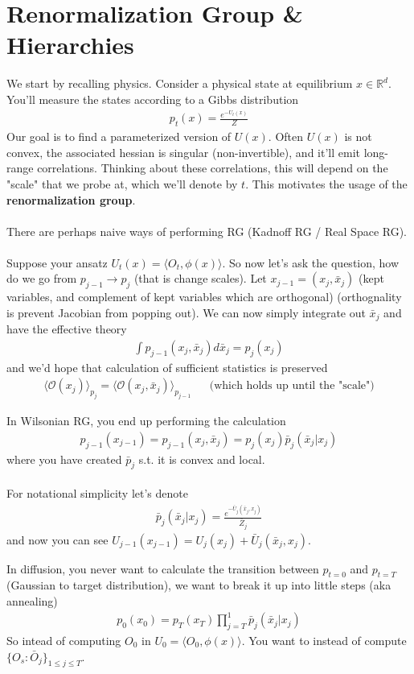 \section{Renormalization Group \& Hierarchies}
We start by recalling physics. Consider a physical state at equilibrium $x \in \mathbb R^d$. You'll measure the states according to a Gibbs distribution
\begin{align}
	p_t(x) = \frac{e^{-U_t(x)}}{Z}
\end{align}
Our goal is to find a parameterized version of $U(x)$. Often $U(x)$ is not convex, the associated hessian is singular (non-invertible), and it'll emit long-range correlations. Thinking about these correlations, this will depend on the "scale" that we probe at, which we'll denote by $t$. This motivates the usage of the \textbf{renormalization group}.
\\
\\
There are perhaps naive ways of performing RG (Kadnoff RG / Real Space RG).
\\
\\
Suppose your ansatz $U_t(x) = \langle O_t, \phi(x)\rangle$. So now let's ask the question, how do we go from $p_{j-1} \to p_j$ (that is change scales). Let $x_{j-1} = (x_j, \bar x_j)$ (kept variables, and complement of kept variables which are orthogonal) (orthognality is prevent Jacobian from popping out). We can now simply integrate out $\bar x_j$ and have the effective theory
\begin{align}
	\int p_{j-1}(x_j, \bar x_j) d\bar x_j = p_j(x_j)
\end{align}
and we'd hope that calculation of sufficient statistics is preserved
\begin{align}
	\langle \mathcal O(x_j)\rangle_{p_j} = \langle \mathcal O(x_j, \bar x_j) \rangle_{p_{j-1}} & & \text{(which holds up until the "scale")}
\end{align}

\begin{sidework}
	In Wilsonian RG, you end up performing the calculation
\begin{align}
	p_{j-1}(x_{j-1}) = p_{j-1}(x_j, \bar x_j) = p_j (x_j) \bar p_j (\bar x_j | x_j)
\end{align}
where you have created $\bar{p}_j$ s.t. it is convex and local. \\
\\
For notational simplicity let's denote
\begin{align}
	\bar p_j(\bar x_j | x_j) = \frac{e^{-\bar U_j(\bar x_j , x_j)}}{\bar Z_j}
\end{align}
and now you can see $U_{j-1}(x_{j-1}) = U_j(x_j) + \bar U_j(\bar x_j, x_j)$.\\
\end{sidework}
In diffusion, you never want to calculate the transition between $p_{t=0}$ and $p_{t=T}$ (Gaussian to target distribution), we want to break it up into little steps (aka annealing)
\begin{align}
	p_0(x_0) = p_T(x_T) \prod_{j=T}^1 \bar p_j(\bar x_j | x_j)
\end{align}
So intead of computing $O_0$ in $U_0 = \langle O_0, \phi(x)\rangle$. You want to instead of compute $\{O_s : \bar O_j\}_{1 \leq j \leq T}$.


